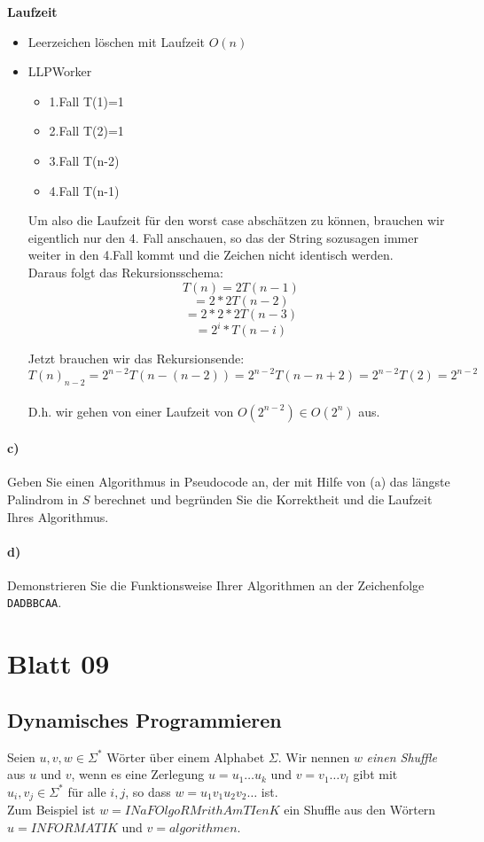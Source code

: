 \documentclass[paper=a4, fontsize=11pt]{scrartcl}
\numberwithin{equation}{section}
\numberwithin{figure}{section}
\numberwithin{table}{section}
\begin{document}
\textbf{Laufzeit} \\
\begin{itemize}
\item Leerzeichen löschen mit Laufzeit $O(n)$
\item LLPWorker 
  \begin{itemize}
  \item 1.Fall 
  T(1)=1
  \item 2.Fall
  T(2)=1
  \item 3.Fall
  T(n-2)
  \item 4.Fall
  T(n-1)
  \end{itemize}
Um also die Laufzeit für den worst case abschätzen zu können, brauchen wir eigentlich nur den 4. Fall anschauen, so das der String sozusagen immer weiter in den 4.Fall kommt und die Zeichen nicht identisch werden. \\

Daraus folgt das Rekursionsschema:
$$T(n)=2T(n-1)$$
$$=2*2T(n-2)$$
$$=2*2*2T(n-3)$$
$$=2^{i}*T(n-i)$$

Jetzt brauchen wir das Rekursionsende:
$$T(n)_{n-2}=2^{n-2}T(n-(n-2))=2^{n-2}T(n-n+2)=2^{n-2}T(2)=2^{n-2}$$ \\

D.h. wir gehen von einer Laufzeit von $O(2^{n-2}) \in O(2^{n})$ aus.
\end{itemize}

\paragraph{c)}
Geben Sie einen Algorithmus in Pseudocode an, der mit Hilfe von (a) das längste Palindrom in $S$ berechnet und
begründen Sie die Korrektheit und die Laufzeit Ihres Algorithmus. \\

\paragraph{d)}
Demonstrieren Sie die Funktionsweise Ihrer Algorithmen an der Zeichenfolge \texttt{DADBBCAA}. \\

\newpage
\section{Blatt 09}
\subsection{Dynamisches Programmieren}
Seien $u,v,w \in \Sigma^*$ Wörter über einem  Alphabet $\Sigma$. Wir nennen $w$ \textit{einen Shuffle} aus $u$ und $v$, wenn es eine Zerlegung $u=u_1\dots u_k$ und $v=v_1\dots v_l$ gibt mit $u_i, v_j\in \Sigma^*$ für alle $i,j$, so dass $w=u_1v_1u_2v_2\dots$ ist.\\
Zum Beispiel ist $w=\mathit{INaFOlgoRMrithAmTIenK}$ ein Shuffle aus den Wörtern $u=\mathit{INFORMATIK}$ und $v=\mathit{algorithmen}$.
\end{document}
